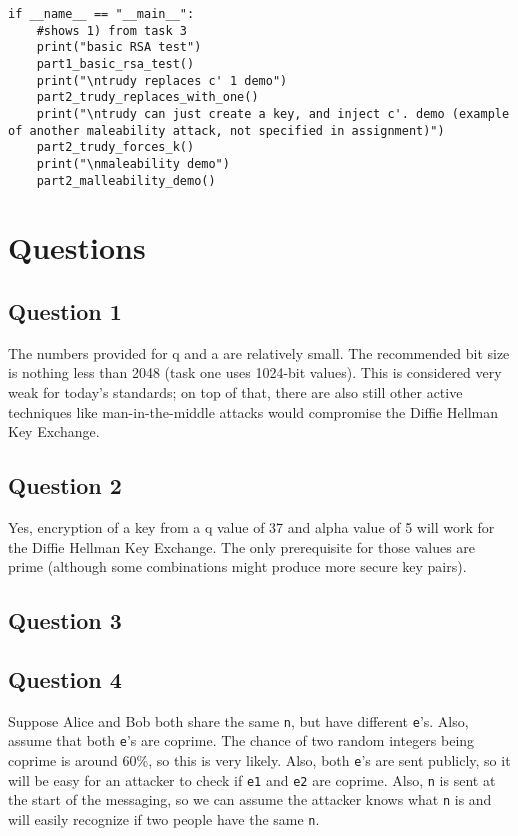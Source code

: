 \documentclass[11pt]{article}
\begin{document}
\begin{lstlisting}
if __name__ == "__main__":
    #shows 1) from task 3
    print("basic RSA test")
    part1_basic_rsa_test()
    print("\ntrudy replaces c' 1 demo")
    part2_trudy_replaces_with_one()
    print("\ntrudy can just create a key, and inject c'. demo (example of another maleability attack, not specified in assignment)")
    part2_trudy_forces_k()
    print("\nmaleability demo")
    part2_malleability_demo()
\end{lstlisting}


\section*{Questions}
\subsection*{Question 1}

The numbers provided for q and a are relatively small. The recommended bit size is nothing less than 2048 (task one uses 1024-bit values). This is considered very weak for today's standards; on top of that, there are also still other active techniques like man-in-the-middle attacks would compromise the Diffie Hellman Key Exchange.

\subsection*{Question 2}

Yes, encryption of a key from a q value of 37 and alpha value of 5 will work for the Diffie Hellman Key Exchange. The only prerequisite for those values are prime (although some combinations might produce more secure key pairs).

\subsection*{Question 3}



\subsection*{Question 4}

Suppose Alice and Bob both share the same \verb|n|, but have different \verb|e|’s. Also, assume that both \verb|e|’s are coprime. The chance of two random integers being coprime is around 60\%, so this is very likely. Also, both \verb|e|'s are sent publicly, so it will be easy for an attacker to check if \verb|e1| and \verb|e2| are coprime. Also, \verb|n| is sent at the start of the messaging, so we can assume the attacker knows what \verb|n| is and will easily recognize if two people have the same \verb|n|.
\end{document}
